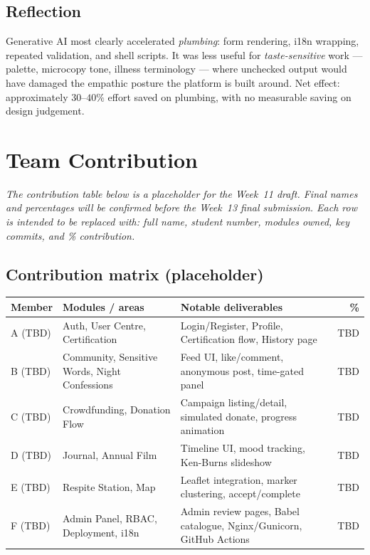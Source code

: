 \subsection{Reflection}
Generative AI most clearly accelerated \emph{plumbing}: form rendering,
i18n wrapping, repeated validation, and shell scripts. It was less
useful for \emph{taste-sensitive} work — palette, microcopy tone,
illness terminology — where unchecked output would have damaged the
empathic posture the platform is built around. Net effect:
approximately $30$–$40\%$ effort saved on plumbing, with no measurable
saving on design judgement.

\section{Team Contribution}\label{sec:team}

\textit{The contribution table below is a placeholder for the Week~11
draft. Final names and percentages will be confirmed before the Week~13
final submission. Each row is intended to be replaced with: full name,
student number, modules owned, key commits, and \% contribution.}

\subsection{Contribution matrix (placeholder)}
\begin{tabularx}{\linewidth}{@{} L{3.0cm} L{4.5cm} X r @{}}
  \toprule
  \textbf{Member} & \textbf{Modules / areas} & \textbf{Notable deliverables} & \textbf{\%} \\
  \midrule
  A (TBD) & Auth, User Centre, Certification & Login/Register, Profile,
            Certification flow, History page & TBD \\
  B (TBD) & Community, Sensitive Words, Night Confessions
          & Feed UI, like/comment, anonymous post, time-gated panel &
            TBD \\
  C (TBD) & Crowdfunding, Donation Flow
          & Campaign listing/detail, simulated donate, progress
            animation & TBD \\
  D (TBD) & Journal, Annual Film & Timeline UI, mood tracking,
            Ken-Burns slideshow & TBD \\
  E (TBD) & Respite Station, Map & Leaflet integration, marker
            clustering, accept/complete & TBD \\
  F (TBD) & Admin Panel, RBAC, Deployment, i18n
          & Admin review pages, Babel catalogue, Nginx/Gunicorn,
            GitHub Actions & TBD \\
  \bottomrule
\end{tabularx}


